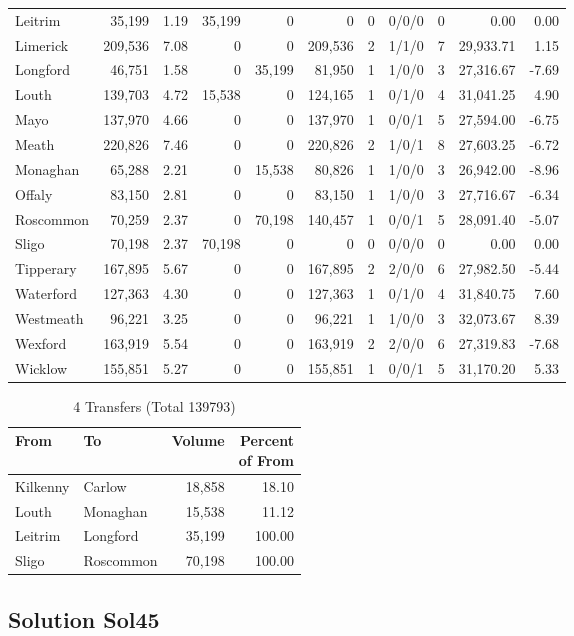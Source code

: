 \documentclass[a4paper]{article}
\begin{document}
\begin{longtable}{lrrrrrrlrrr}
Leitrim&35,199& 1.19&35,199&0&0&0&0/0/0&0& 0.00& 0.00\\ 
Limerick&209,536& 7.08&0&0&209,536&2&1/1/0&7&29,933.71& 1.15\\ 
Longford&46,751& 1.58&0&35,199&81,950&1&1/0/0&3&27,316.67&-7.69\\ 
Louth&139,703& 4.72&15,538&0&124,165&1&0/1/0&4&31,041.25& 4.90\\ 
Mayo&137,970& 4.66&0&0&137,970&1&0/0/1&5&27,594.00&-6.75\\ 
Meath&220,826& 7.46&0&0&220,826&2&1/0/1&8&27,603.25&-6.72\\ 
Monaghan&65,288& 2.21&0&15,538&80,826&1&1/0/0&3&26,942.00&-8.96\\ 
Offaly&83,150& 2.81&0&0&83,150&1&1/0/0&3&27,716.67&-6.34\\ 
Roscommon&70,259& 2.37&0&70,198&140,457&1&0/0/1&5&28,091.40&-5.07\\ 
Sligo&70,198& 2.37&70,198&0&0&0&0/0/0&0& 0.00& 0.00\\ 
Tipperary&167,895& 5.67&0&0&167,895&2&2/0/0&6&27,982.50&-5.44\\ 
Waterford&127,363& 4.30&0&0&127,363&1&0/1/0&4&31,840.75& 7.60\\ 
Westmeath&96,221& 3.25&0&0&96,221&1&1/0/0&3&32,073.67& 8.39\\ 
Wexford&163,919& 5.54&0&0&163,919&2&2/0/0&6&27,319.83&-7.68\\ 
Wicklow&155,851& 5.27&0&0&155,851&1&0/0/1&5&31,170.20& 5.33\\ 
\end{longtable}

\begin{table}[htbp]
\caption{4 Transfers (Total 139793)}
\centering
\begin{tabular}{llrr} \toprule
From &To &Volume &\shortstack{Percent\\of From} \\ \midrule
Kilkenny&Carlow&18,858&18.10\\ 
Louth&Monaghan&15,538&11.12\\ 
Leitrim&Longford&35,199&100.00\\ 
Sligo&Roscommon&70,198&100.00\\ 
\bottomrule
\end{tabular}
\end{table}

\clearpage
\subsection{Solution Sol45}
\end{document}
